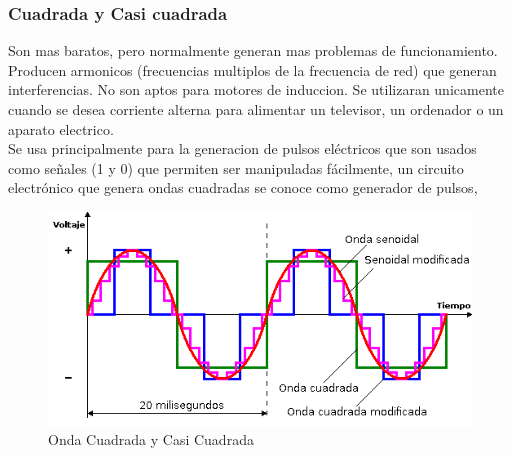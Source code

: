 \documentclass[11pt]{article}
\begin{document}
\subsubsection{Cuadrada y Casi cuadrada}
Son mas baratos, pero normalmente generan mas problemas de funcionamiento. Producen armonicos (frecuencias multiplos de la frecuencia de red) que generan interferencias. No son aptos para motores de induccion. Se utilizaran unicamente cuando se desea corriente alterna para alimentar un televisor, un ordenador o un aparato electrico.\\Se usa principalmente para la generacion de pulsos eléctricos que son usados como señales (1 y 0) que permiten ser manipuladas fácilmente, un circuito electrónico que genera ondas cuadradas se conoce como generador de pulsos,  
\begin{center}
\begin{figure}[htp]
\centering
\includegraphics[scale=0.50]{Onda cuadrada y casi cuadrada.png}
\caption{Onda Cuadrada y Casi Cuadrada}
\label{}
\end{figure}
\end{center}
\end{document}
